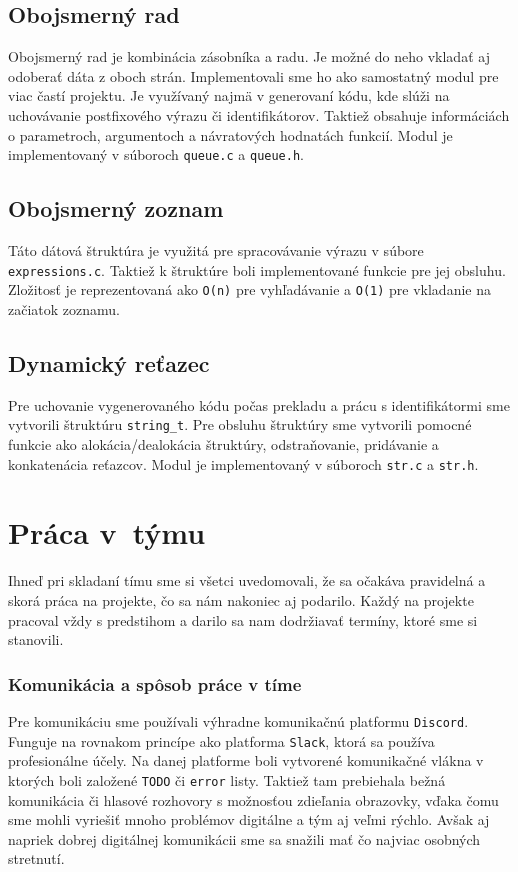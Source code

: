 \documentclass[a4paper, 11pt]{article}
\begin{document}
    \subsection{Obojsmerný rad}
    Obojsmerný rad je kombinácia zásobníka a radu. Je možné do neho vkladať aj odoberať dáta z oboch strán.
    Implementovali sme ho ako samostatný modul pre viac častí projektu.
    Je využívaný najmä v generovaní kódu, kde slúži na uchovávanie postfixového výrazu či
    identifikátorov. Taktiež obsahuje informáciách o parametroch, argumentoch a návratových hodnatách funkcií.
    Modul je implementovaný v súboroch \texttt{queue.c} a \texttt{queue.h}.

    \subsection{Obojsmerný zoznam}
    Táto dátová štruktúra je využitá pre spracovávanie výrazu v súbore \texttt{expressions.c}. Taktiež k štruktúre boli
    implementované funkcie pre jej obsluhu. Zložitosť je reprezentovaná ako \texttt{O(n)} pre vyhľadávanie a \texttt{O(1)}
    pre vkladanie na začiatok zoznamu.

    \subsection{Dynamický reťazec}
    Pre uchovanie vygenerovaného kódu počas prekladu a prácu s identifikátormi sme vytvorili štruktúru \texttt{string\_t}.
    Pre obsluhu štruktúry sme vytvorili pomocné funkcie ako alokácia/dealokácia štruktúry,
    odstraňovanie, pridávanie a konkatenácia reťazcov.
    Modul je implementovaný v súboroch \texttt{str.c} a \texttt{str.h}.


    \section{Práca v~týmu}
    Ihneď pri skladaní tímu sme si všetci uvedomovali, že sa
    očakáva pravidelná a skorá práca na projekte, čo sa nám nakoniec aj podarilo.
    Každý na projekte pracoval vždy s predstihom a darilo sa nam dodržiavať termíny,
    ktoré sme si stanovili.


    \subsubsection{Komunikácia a spôsob práce v tíme}
    Pre komunikáciu sme používali výhradne komunikačnú platformu \texttt{Discord}. Funguje na
    rovnakom princípe ako platforma \texttt{Slack}, ktorá sa používa profesionálne účely.
    Na danej platforme boli vytvorené komunikačné vlákna
    v ktorých boli založené \texttt{TODO} či \texttt{error} listy. Taktiež tam prebiehala bežná komunikácia či hlasové rozhovory s
    možnosťou zdieľania obrazovky, vďaka čomu sme mohli vyriešiť mnoho problémov
    digitálne a tým aj veľmi rýchlo. Avšak aj napriek
    dobrej digitálnej komunikácii sme sa snažili mať čo najviac
    osobných stretnutí.
\end{document}

